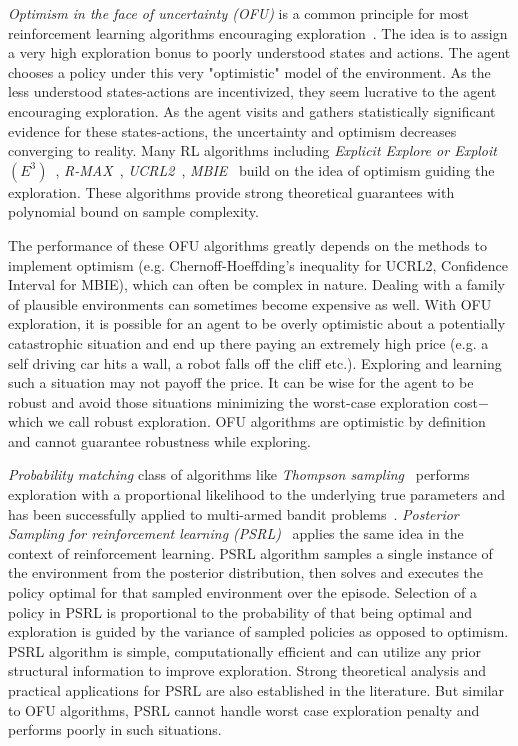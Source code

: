 \documentclass{article}
\theoremstyle{plain}
\theoremstyle{definition}
\begin{document}
\emph{Optimism in the face of uncertainty (OFU)} is a common principle for most reinforcement learning algorithms encouraging exploration~\citep{Jaksch2010,Brafman2001,Kearns1998a}. The idea is to assign a very high exploration bonus to poorly understood states and actions. The agent chooses a policy under this very "optimistic" model of the environment. As the less understood states-actions are incentivized, they seem lucrative to the agent encouraging exploration. As the agent visits and gathers statistically significant evidence for these states-actions, the uncertainty and optimism decreases converging to reality. Many RL algorithms including \emph{Explicit Explore or Exploit $(E^3)$}~\citep{Kearns1998a}, \emph{R-{\ssmall MAX}}~\cite{Brafman2001}, \emph{UCRL2}~\cite{Auer2006}, \emph{MBIE}~\citep{Strehl2008,Strehl2004,Wiering1998} build on the idea of optimism guiding the exploration. These algorithms provide strong theoretical guarantees with polynomial bound on sample complexity. 

The performance of these OFU algorithms greatly depends on the methods to implement optimism (e.g. Chernoff-Hoeffding's inequality for UCRL2, Confidence Interval for MBIE), which can often be complex in nature. Dealing with a family of plausible environments can sometimes become expensive as well. With OFU exploration, it is possible for an agent to be overly optimistic about a potentially catastrophic situation and end up there paying an extremely high price (e.g. a self driving car hits a wall, a robot falls off the cliff etc.). Exploring and learning such a situation may not payoff the price. It can be wise for the agent to be robust and avoid those situations minimizing the worst-case exploration cost$-$ which we call robust exploration. OFU algorithms are optimistic by definition and cannot guarantee robustness while exploring.

\emph{Probability matching} class of algorithms like \emph{Thompson sampling}~\citep{Thompson1933} performs exploration with a proportional likelihood to the underlying true parameters and has been successfully applied to multi-armed bandit problems~\citep{Agrawal2012,Agrawal2011}. \emph{Posterior Sampling for reinforcement learning (PSRL)}~\citep{Osband2016, Osband2013, Strens2002} applies the same idea in the context of reinforcement learning. PSRL algorithm samples a single instance of the environment from the posterior distribution, then solves and executes the policy optimal for that sampled environment over the episode. Selection of a policy in PSRL is proportional to the probability of that being optimal and exploration is guided by the variance of sampled policies as opposed to optimism. PSRL algorithm is simple, computationally efficient and can utilize any prior structural information to improve exploration. Strong theoretical analysis and practical applications for PSRL are also established in the literature. But similar to OFU algorithms, PSRL cannot handle worst case exploration penalty and performs poorly in such situations.
\end{document}
